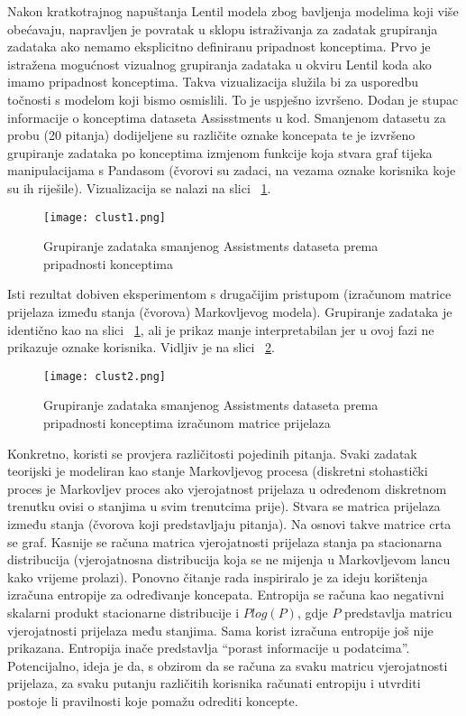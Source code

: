 \noindent Nakon kratkotrajnog napuštanja Lentil modela zbog bavljenja modelima koji više obećavaju, napravljen je povratak u sklopu istraživanja za zadatak grupiranja zadataka ako nemamo eksplicitno definiranu pripadnost konceptima.\newline
Prvo je istražena mogućnost vizualnog grupiranja zadataka u okviru Lentil koda ako imamo pripadnost konceptima. Takva vizualizacija služila bi za usporedbu točnosti s modelom koji bismo osmislili. To je uspješno izvršeno. Dodan je stupac informacije o konceptima dataseta Assisstments u kod. Smanjenom datasetu za probu (20 pitanja) dodijeljene su različite oznake koncepata te je izvršeno grupiranje zadataka po konceptima izmjenom funkcije koja stvara graf tijeka manipulacijama s Pandasom (čvorovi su zadaci, na vezama oznake korisnika koje su ih riješile). Vizualizacija se nalazi na slici ~\ref{fig:clust1}. \pagebreak

\begin{figure}[!htb]
\centering
\texttt{[image: clust1.png]}
\caption{Grupiranje zadataka smanjenog Assistments dataseta prema pripadnosti konceptima}
\label{fig:clust1}
\end{figure}

\noindent Isti rezultat dobiven eksperimentom s drugačijim pristupom (izračunom matrice prijelaza između stanja (čvorova) Markovljevog modela). Grupiranje zadataka je identično kao na slici ~\ref{fig:clust1}, ali je prikaz manje interpretabilan jer u ovoj fazi ne prikazuje oznake korisnika. Vidljiv je na slici ~\ref{fig:clust2}.\newline 

\begin{figure}[!htb]
\centering
\texttt{[image: clust2.png]}
\caption{Grupiranje zadataka smanjenog Assistments dataseta prema pripadnosti konceptima izračunom matrice prijelaza}
\label{fig:clust2}
\end{figure}
\pagebreak

Konkretno, koristi se provjera različitosti pojedinih pitanja. Svaki zadatak teorijski je modeliran kao stanje Markovljevog procesa (diskretni stohastički proces je Markovljev proces ako vjerojatnost prijelaza u određenom diskretnom trenutku ovisi o stanjima u svim trenutcima prije). Stvara se matrica prijelaza između stanja (čvorova koji predstavljaju pitanja). Na osnovi takve matrice crta se graf. Kasnije se računa matrica vjerojatnosti prijelaza stanja pa stacionarna distribucija (vjerojatnosna distribucija koja se ne mijenja u Markovljevom lancu kako vrijeme prolazi). \newline
Ponovno čitanje rada \citep{lentil} inspiriralo je za ideju korištenja izračuna entropije za određivanje koncepata. Entropija se računa kao negativni skalarni produkt stacionarne distribucije i $Plog(P)$, gdje $P$ predstavlja matricu vjerojatnosti prijelaza među stanjima. Sama korist izračuna entropije još nije prikazana. Entropija inače predstavlja “porast informacije u podatcima”. Potencijalno, ideja je da, s obzirom da se računa za svaku matricu vjerojatnosti prijelaza, za svaku putanju različitih korisnika računati entropiju i utvrditi postoje li pravilnosti koje pomažu odrediti koncepte. 

